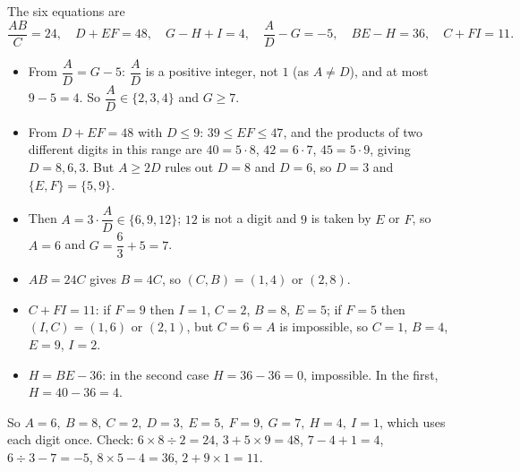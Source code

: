 The six equations are
\[\dfrac{AB}{C}=24,\quad D+EF=48,\quad G-H+I=4,\quad \dfrac AD-G=-5,\quad BE-H=36,\quad C+FI=11.\]
\begin{itemize}
\item From $\dfrac AD=G-5$: $\dfrac AD$ is a positive integer, not $1$ (as $A\ne D$), and at most $9-5=4$. So $\dfrac AD\in\{2,3,4\}$ and $G\ge7$.
\item From $D+EF=48$ with $D\le9$: $39\le EF\le47$, and the products of two different digits in this range are $40=5\cdot8$, $42=6\cdot7$, $45=5\cdot9$, giving $D=8,6,3$. But $A\ge2D$ rules out $D=8$ and $D=6$, so $D=3$ and $\{E,F\}=\{5,9\}$.
\item Then $A=3\cdot\dfrac AD\in\{6,9,12\}$; $12$ is not a digit and $9$ is taken by $E$ or $F$, so $A=6$ and $G=\dfrac63+5=7$.
\item $AB=24C$ gives $B=4C$, so $(C,B)=(1,4)$ or $(2,8)$.
\item $C+FI=11$: if $F=9$ then $I=1$, $C=2$, $B=8$, $E=5$; if $F=5$ then $(I,C)=(1,6)$ or $(2,1)$, but $C=6=A$ is impossible, so $C=1$, $B=4$, $E=9$, $I=2$.
\item $H=BE-36$: in the second case $H=36-36=0$, impossible. In the first, $H=40-36=4$.
\end{itemize}
So $\boxed{A=6,\ B=8,\ C=2,\ D=3,\ E=5,\ F=9,\ G=7,\ H=4,\ I=1}$, which uses each digit once. Check: $6\times8\div2=24$, $3+5\times9=48$, $7-4+1=4$, $6\div3-7=-5$, $8\times5-4=36$, $2+9\times1=11$.
